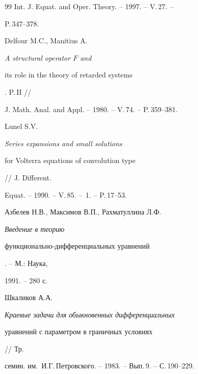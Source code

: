 \begin{thebibliography}{99}
Int. J. Equat. and Oper. Theory. -- 1997. -- V.\,27. -- 


P.\,347--378. 




Delfour M.C., Manitius A. {\em A structural operator $F$ and 


its role in the theory of retarded systems}. P.\,II // 


J. Math. Anal. and Appl. -- 1980. -- V.\,74. -- P.\,359--381. 




Lunel S.V. {\em Series expansions and small solutions 


for Volterra equations of convolution type} // J. Different. 


Equat. -- 1990. -- V.\,85. -- \No\,1. -- P.\,17--53. 




Азбелев Н.В., Максимов В.П., Рахматуллина Л.Ф. {\em Введение в теорию 


функционально-дифференциальных уравнений}. -- М.: Наука, 


1991. -- 280 с. 




Шкаликов А.А. {\em Краевые задачи для обыкновенных дифференциальных 


уравнений с параметром в граничных условиях} // Тр. 


семин. им.~И.Г.\,Петровского. -- 1983. -- Вып.\,9. -- С.\,190--229. 


 


\end{thebibliography} 


 


\vskip 2cm 


 






 


\label{end} 


 


